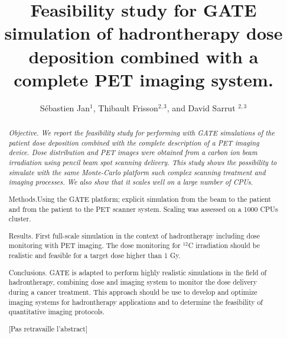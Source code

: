 \documentclass[11pt]{iopart}
\newcommand{\sjnote}[1]{{\color{red}[#1]}}
\begin{document}
\title[Gate Hadron PET]{Feasibility study for GATE simulation of
  hadrontherapy dose deposition combined with a complete PET imaging
  system.}


\author{S{\'e}bastien Jan$^{1}$, Thibault Frisson$^{2,3}$, and David Sarrut $^{2,3}$}

\address{$^1$ CEA, Service Hospitalier Fr{\'e}d{\'e}ric Joliot, Orsay, France}
\address{$^2$ University of Lyon, CREATIS-LRMN; CNRS UMR5220; INSA-Lyon, France}
\address{$^3$ University of Lyon, L\'eon B\'erard Cancer Center, F-69373, Lyon, France}

\linenumbers
\begin{abstract}

  {\it Objective. We report the feasibility study for performing with
    GATE simulations of the patient dose deposition combined with the
    complete description of a PET imaging device. Dose distribution
    and PET images were obtained from a carbon ion beam irradiation
    using pencil beam spot scanning delivery. This study shows the
    possibility to simulate with the same Monte-Carlo platform such
    complex scanning treatment and imaging processes. We also show
    that it scales well on a large number of CPUs.

    Methods.Using the GATE platform; explicit simulation from the
    beam to the patient and from the patient to the PET scanner
    system. Scaling was assessed on a 1000 CPUs cluster.

    Results.  First full-scale simulation in the context of
    hadrontherapy including dose monitoring with PET imaging. The dose
    monitoring for $^{12}$C irradiation should be realistic and
    feasible for a target dose higher than 1 Gy.

    Conclusions.  GATE is adapted to perform highly realistic
    simulations in the field of hadrontherapy, combining dose and
    imaging system to monitor the dose delivery during a cancer
    treatment. This approach should be use to develop and optimize
    imaging systems for hadrontherapy applications and to determine
    the feasibility of quantitative imaging protocols. }
\sjnote{Pas retravaille l'abstract}
\end{abstract}
\end{document}
